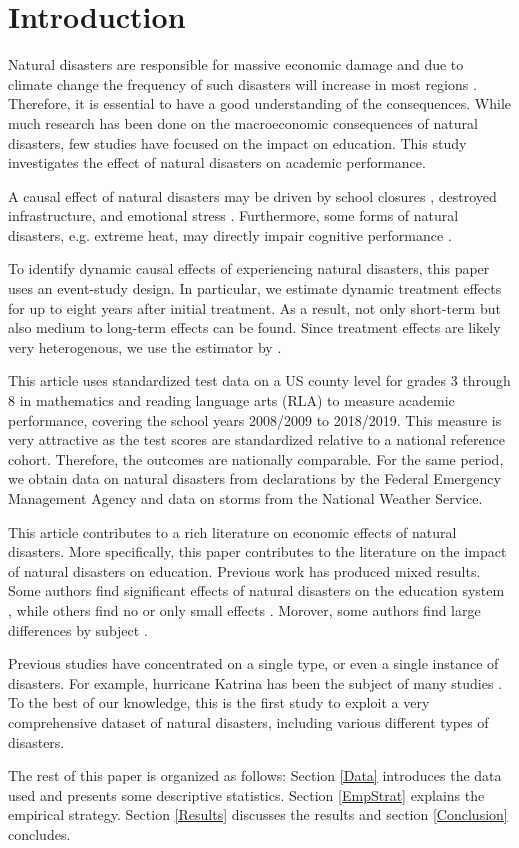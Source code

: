 
\section{Introduction}

Natural disasters are responsible for massive economic damage and due to climate change the frequency of such disasters will increase in most regions \citep{IPCC_2021}. Therefore, it is essential to have a good understanding of the consequences. While much research has been done on the macroeconomic consequences of natural disasters, few studies have focused on the impact on education. This study investigates the effect of natural disasters on academic performance.

A causal effect of natural disasters may be driven by school closures \citep{Grewening_2020}, destroyed infrastructure, and emotional stress \citep{Vogel_2016}. Furthermore, some forms of natural disasters, e.g. extreme heat, may directly impair cognitive performance \citep{Ramsey_1995}.

To identify dynamic causal effects of experiencing natural disasters, this paper uses an event-study design. In particular, we estimate dynamic treatment effects for up to eight years after initial treatment. As a result, not only short-term but also medium to long-term effects can be found. Since treatment effects are likely very heterogenous, we use the estimator by \cite{Sun_2021}. 

This article uses standardized test data on a US county level for grades 3 through 8 in mathematics and reading language arts (RLA) to measure academic performance, covering the school years 2008/2009 to 2018/2019. This measure is very attractive as the test scores are standardized relative to a national reference cohort. Therefore, the outcomes are nationally comparable. For the same period, we obtain data on natural disasters from declarations by the Federal Emergency Management Agency and data on storms from the National Weather Service.

This article contributes to a rich literature on economic effects of natural disasters. More specifically, this paper contributes to the literature on the impact of natural disasters on education. Previous work has produced mixed results. Some authors find significant effects of natural disasters on the education system \citep{Holmes_2002, Cuaresma_2010, Sacerdote_2012, Goodman_2020}, while others find no or only small effects \citep{Baggerly_2008, Pane_2008}. Morover, some authors find large differences by subject \citep{Spencer_2016}.

Previous studies have concentrated on a single type, or even a single instance of disasters. For example, hurricane Katrina has been the subject of many studies \citep[e.g.][]{Sacerdote_2012, Deryugina_2018}. To the best of our knowledge, this is the first study to exploit a very comprehensive dataset of natural disasters, including various different types of disasters. 

The rest of this paper is organized as follows: Section \ref{Data} introduces the data used and presents some descriptive statistics. Section \ref{EmpStrat} explains the empirical strategy. Section \ref{Results} discusses the results and section \ref{Conclusion} concludes.

